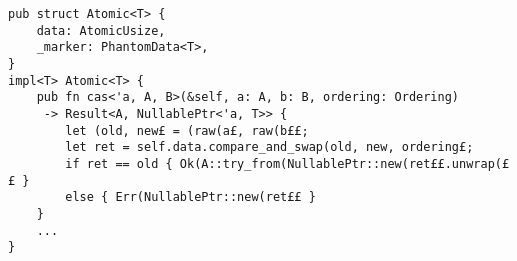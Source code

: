 \begin{lstlisting}[caption=Excerpt of \mc{Atomic}s definitions (Trait bounds omitted for brevity)]
pub struct Atomic<T> {
    data: AtomicUsize,
    _marker: PhantomData<T>,
}
impl<T> Atomic<T> {
    pub fn cas<'a, A, B>(&self, a: A, b: B, ordering: Ordering)
     -> Result<A, NullablePtr<'a, T>> {
        let (old, new£ = (raw(a£, raw(b££;
        let ret = self.data.compare_and_swap(old, new, ordering£;
        if ret == old { Ok(A::try_from(NullablePtr::new(ret££.unwrap(££ }
        else { Err(NullablePtr::new(ret££ }
    }
    ...
}

\end{lstlisting}
